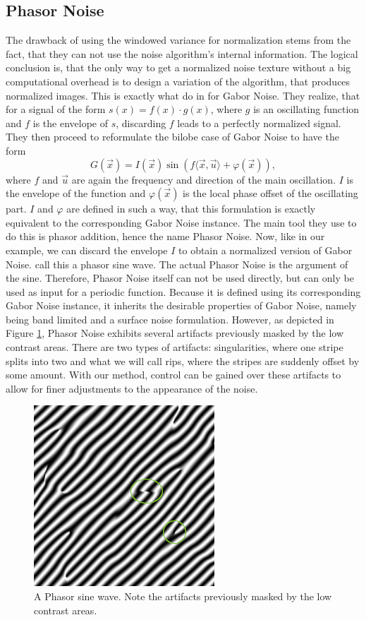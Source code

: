\documentclass{utue} %
\begin{document}
\subsection{Phasor Noise}\label{sec:phasorNoise}
The drawback of using the windowed variance for normalization stems from the fact, that they can not use the noise algorithm's internal information. The logical conclusion is, that the only way to get a normalized noise texture without a big computational overhead is to design a variation of the algorithm, that produces normalized images. This is exactly what \citeauthor{phasorNoise} do in \cite{phasorNoise} for Gabor Noise. They realize, that for a signal of the form $s(x) = f(x)\cdot g(x)$, where $g$ is an oscillating function and $f$ is the envelope of $s$, discarding $f$ leads to a perfectly normalized signal. They then proceed to reformulate the bilobe case of Gabor Noise to have the form
$$
G(\vec{x}) = I(\vec{x})\sin{(f\langle\vec{x},\vec{u}\rangle + \varphi(\vec{x}))},
$$
where $f$ and $\vec{u}$ are again the frequency and direction of the main oscillation. $I$ is the envelope of the function and $\varphi(\vec{x})$ is the local phase offset of the oscillating part. $I$ and $\varphi$ are defined in such a way, that this formulation is exactly equivalent to the corresponding Gabor Noise instance. The main tool they use to do this is phasor addition, hence the name Phasor Noise. Now, like in our example, we can discard the envelope $I$ to obtain a normalized version of Gabor Noise. \citeauthor{phasorNoise} call this a phasor sine wave. The actual Phasor Noise is the argument of the sine. Therefore, Phasor Noise itself can not be used directly, but can only be used as input for a periodic function. Because it is defined using its corresponding Gabor Noise instance, it inherits the desirable properties of Gabor Noise, namely being band limited and a surface noise formulation. However, as depicted in Figure \ref{fig:phasorNoise}, Phasor Noise exhibits several artifacts previously masked by the low contrast areas. There are two types of artifacts: singularities, where one stripe splits into two and what we will call rips, where the stripes are suddenly offset by some amount. With our method, control can be gained over these artifacts to allow for finer adjustments to the appearance of the noise.

\begin{figure}[ht]
  \centering
  \includegraphics[width = 0.49\linewidth]{images/phasorSineWave}
  \caption{A Phasor sine wave. Note the artifacts previously masked by the low contrast areas.}\label{fig:phasorNoise}
\end{figure}
\end{document}
